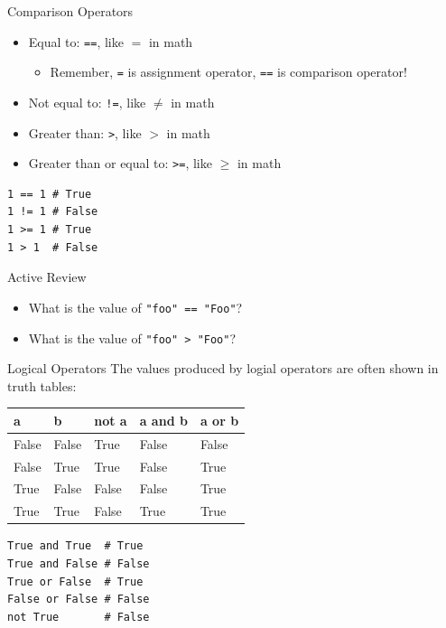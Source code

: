 \documentclass[smaller, aspectratio=1610]{beamer}
\begin{document}
\begin{frame}[label={sec:org7e423db},fragile]{Comparison Operators}
 \begin{itemize}
\item Equal to: \texttt{==}, like \(=\) in math

\begin{itemize}
\item Remember, \texttt{=} is assignment operator, \texttt{==} is comparison operator!
\end{itemize}

\item Not equal to: \texttt{!=}, like \(\ne\) in math
\item Greater than: \texttt{>}, like \(>\) in math
\item Greater than or equal to: \texttt{>=}, like \(\ge\) in math
\end{itemize}

\lstset{language=Python,label= ,caption= ,captionpos=b,numbers=none}
\begin{lstlisting}
1 == 1 # True
1 != 1 # False
1 >= 1 # True
1 > 1  # False
\end{lstlisting}

\begin{block}{Active Review}
\begin{itemize}
\item What is the value of \texttt{"foo" == "Foo"}?
\item What is the value of \texttt{"foo" > "Foo"}?
\end{itemize}
\end{block}
\end{frame}

\begin{frame}[label={sec:org3ef95db},fragile]{Logical Operators}
 The values produced by logial operators are often shown in truth tables:

\begin{center}
\begin{tabular}{|l|l|l|l|l|}
\hline
a & b & not a & a and b & a or b \\
\hline
False & False & True & False & False \\
False & True & True & False & True \\
True & False & False & False & True \\
True & True & False & True & True \\
\hline
\end{tabular}
\end{center}

\lstset{language=Python,label= ,caption= ,captionpos=b,numbers=none}
\begin{lstlisting}
True and True  # True
True and False # False
True or False  # True
False or False # False
not True       # False
\end{lstlisting}
\end{frame}
\end{document}
